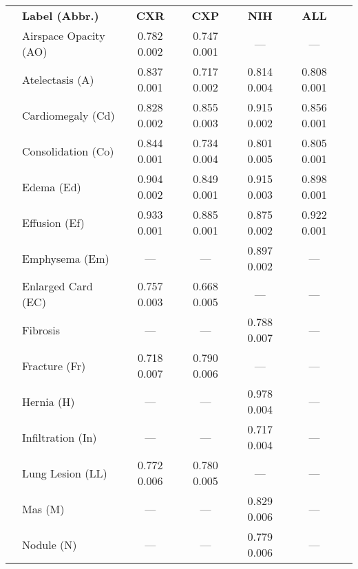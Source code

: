 \documentclass{ws-procs11x85}
\begin{document}
\begin{table}[h]
{\begin{tabular}{@{}llccccc@{}}
\toprule
& \textbf{Label (Abbr.)}  & \textbf{CXR}               & \textbf{CXP}           & \textbf{NIH} & \textbf{ALL} \\ \colrule
& Airspace Opacity (AO)   & 0.782   0.002         & 0.747    0.001    & --- & --- \\
& Atelectasis (A)         & 0.837   0.001         & 0.717    0.002    &  0.814    0.004 & 0.808    0.001\\ 
& Cardiomegaly (Cd)       & 0.828   0.002         & 0.855    0.003    & 0.915    0.002  & 0.856    0.001\\
& Consolidation (Co)      & 0.844   0.001         & 0.734    0.004    & 0.801    0.005 & 0.805    0.001\\
& Edema (Ed)              & 0.904   0.002         & 0.849    0.001    &  0.915    0.003 & 0.898    0.001 \\
& Effusion (Ef)           & 0.933   0.001         & 0.885    0.001    & 0.875    0.002 & 0.922    0.001\\
& Emphysema (Em)          & ---                        & ---                    & 0.897    0.002 & ---\\
& Enlarged Card (EC)      & 0.757   0.003         & 0.668    0.005    & ---                     & --- \\
& Fibrosis                & ---                        & ---                    & 0.788    0.007 & --- \\ 
& Fracture (Fr)           & 0.718   0.007         & 0.790    0.006    & --- & ---\\
& Hernia (H)              & ---                        & ---                    & 0.978    0.004& ---\\
& Infiltration (In)       & ---                        & ---                    & 0.717    0.004 & --- \\
& Lung Lesion (LL)        & 0.772   0.006         & 0.780    0.005    & ---& ---\\
& Mas (M)                 & ---                        & ---                    & 0.829    0.006 & ---\\
& Nodule (N)              & ---                        & ---                    & 0.779    0.006 & ---\\

\end{tabular}}
\end{table}
\end{document}
